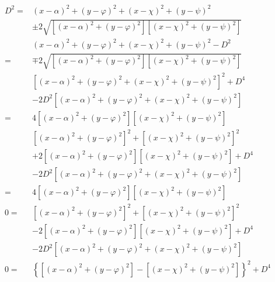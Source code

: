 \documentclass[
]{book}
\theoremstyle{definition}
\theoremstyle{definition}
\theoremstyle{definition}
\theoremstyle{definition}
\theoremstyle{remark}
\begin{document}
\[
\begin{aligned}
D^{2}= & \left(x-\alpha\right)^{2}+\left(y-\varphi\right)^{2}+\left(x-\chi\right)^{2}+\left(y-\psi\right)^{2}\\
 & \pm2\sqrt{\left[\left(x-\alpha\right)^{2}+\left(y-\varphi\right)^{2}\right]\left[\left(x-\chi\right)^{2}+\left(y-\psi\right)^{2}\right]}\\
 & \left(x-\alpha\right)^{2}+\left(y-\varphi\right)^{2}+\left(x-\chi\right)^{2}+\left(y-\psi\right)^{2}-D^{2}\\
= & \mp2\sqrt{\left[\left(x-\alpha\right)^{2}+\left(y-\varphi\right)^{2}\right]\left[\left(x-\chi\right)^{2}+\left(y-\psi\right)^{2}\right]}\\
 & \left[\left(x-\alpha\right)^{2}+\left(y-\varphi\right)^{2}+\left(x-\chi\right)^{2}+\left(y-\psi\right)^{2}\right]^{2}+D^{4}\\
 & -2D^{2}\left[\left(x-\alpha\right)^{2}+\left(y-\varphi\right)^{2}+\left(x-\chi\right)^{2}+\left(y-\psi\right)^{2}\right]\\
= & 4\left[\left(x-\alpha\right)^{2}+\left(y-\varphi\right)^{2}\right]\left[\left(x-\chi\right)^{2}+\left(y-\psi\right)^{2}\right]\\
 & \left[\left(x-\alpha\right)^{2}+\left(y-\varphi\right)^{2}\right]^{2}+\left[\left(x-\chi\right)^{2}+\left(y-\psi\right)^{2}\right]^{2}\\
 & +2\left[\left(x-\alpha\right)^{2}+\left(y-\varphi\right)^{2}\right]\left[\left(x-\chi\right)^{2}+\left(y-\psi\right)^{2}\right]+D^{4}\\
 & -2D^{2}\left[\left(x-\alpha\right)^{2}+\left(y-\varphi\right)^{2}+\left(x-\chi\right)^{2}+\left(y-\psi\right)^{2}\right]\\
= & 4\left[\left(x-\alpha\right)^{2}+\left(y-\varphi\right)^{2}\right]\left[\left(x-\chi\right)^{2}+\left(y-\psi\right)^{2}\right]\\
0= & \left[\left(x-\alpha\right)^{2}+\left(y-\varphi\right)^{2}\right]^{2}+\left[\left(x-\chi\right)^{2}+\left(y-\psi\right)^{2}\right]^{2}\\
 & -2\left[\left(x-\alpha\right)^{2}+\left(y-\varphi\right)^{2}\right]\left[\left(x-\chi\right)^{2}+\left(y-\psi\right)^{2}\right]+D^{4}\\
 & -2D^{2}\left[\left(x-\alpha\right)^{2}+\left(y-\varphi\right)^{2}+\left(x-\chi\right)^{2}+\left(y-\psi\right)^{2}\right]\\
0= & \left\{ \left[\left(x-\alpha\right)^{2}+\left(y-\varphi\right)^{2}\right]-\left[\left(x-\chi\right)^{2}+\left(y-\psi\right)^{2}\right]\right\} ^{2}+D^{4}\\

\end{aligned}\]
\end{document}

